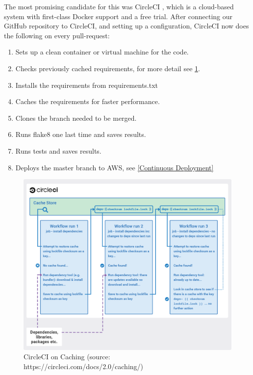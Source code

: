\documentclass[main.tex]{subfiles}
\begin{document}
The most promising candidate for this was CircleCI \cite{CircleCI}, which is a cloud-based system with first-class Docker support and a free trial. After connecting our GitHub repository to CircleCI, and setting up a configuration, CircleCI now does the following on every pull-request:

\begin{enumerate}
    \item Sets up a clean container or virtual machine for the code.
    \item Checks previously cached requirements, for more detail see \figurename{\ref{cache_CI}}.
    \item Installs the requirements from requirements.txt
    \item Caches the requirements for faster performance.
    \item Clones the branch needed to be merged.
    \item Runs flake8 one last time and saves results.
    \item Runs tests and saves results.
    \item Deploys the master branch to AWS, see \ref{Continuous Deployment}
\end{enumerate}

 \begin{figure}[H]
   \centering
   \includegraphics[width=\textwidth]{05Coding/05Pictures/cache_CI.png}
   \caption{CircleCI on Caching (source: https://circleci.com/docs/2.0/caching/)}
   \label{cache_CI}
\end{figure}
\end{document}
